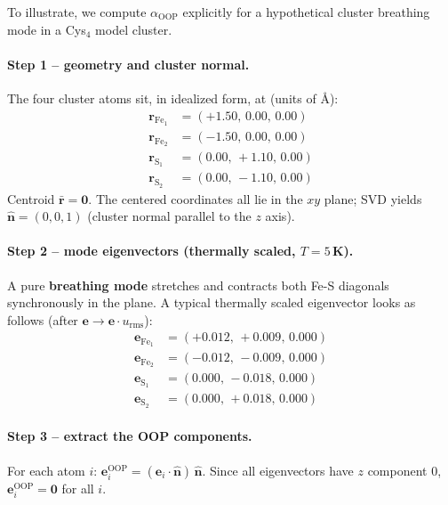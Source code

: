 \documentclass[11pt,a4paper,twoside]{article}
\providecommand{\angstrom}{\text{\AA}}    %
\newcommand{\OOP}{\mathrm{OOP}}
\theoremstyle{remark}
\begin{document}
To illustrate, we compute $\alpha_{\OOP}$ explicitly for a
hypothetical cluster breathing mode in a Cys$_4$ model cluster.

\paragraph{Step 1 -- geometry and cluster normal.}
The four cluster atoms sit, in idealized form, at (units of $\angstrom$):
\begin{align*}
  \mathbf{r}_{\text{Fe}_1} &= (+1.50,\, 0.00,\, 0.00) \\
  \mathbf{r}_{\text{Fe}_2} &= (-1.50,\, 0.00,\, 0.00) \\
  \mathbf{r}_{\text{S}_1}  &= ( 0.00,\, +1.10,\, 0.00) \\
  \mathbf{r}_{\text{S}_2}  &= ( 0.00,\, -1.10,\, 0.00)
\end{align*}
Centroid $\bar{\mathbf{r}} = \mathbf{0}$. The centered coordinates
all lie in the $xy$ plane; SVD yields
$\hat{\mathbf{n}} = (0, 0, 1)$ (cluster normal parallel to the $z$ axis).

\paragraph{Step 2 -- mode eigenvectors (thermally scaled, $T=5$\,K).}
A pure \textbf{breathing mode} stretches and contracts both Fe-S
diagonals synchronously in the plane. A typical thermally scaled
eigenvector looks as follows (after $\mathbf{e} \to \mathbf{e}\cdot u_\text{rms}$):
\begin{align*}
  \mathbf{e}_{\text{Fe}_1} &= (+0.012,\, +0.009,\, 0.000) \\
  \mathbf{e}_{\text{Fe}_2} &= (-0.012,\, -0.009,\, 0.000) \\
  \mathbf{e}_{\text{S}_1}  &= ( 0.000,\, -0.018,\, 0.000) \\
  \mathbf{e}_{\text{S}_2}  &= ( 0.000,\, +0.018,\, 0.000)
\end{align*}

\paragraph{Step 3 -- extract the OOP components.}
For each atom $i$:
$\mathbf{e}_i^\text{OOP} = (\mathbf{e}_i \cdot \hat{\mathbf{n}})\,
\hat{\mathbf{n}}$. Since all eigenvectors have $z$ component $0$,
$\mathbf{e}_i^\text{OOP} = \mathbf{0}$ for all $i$.
\end{document}
